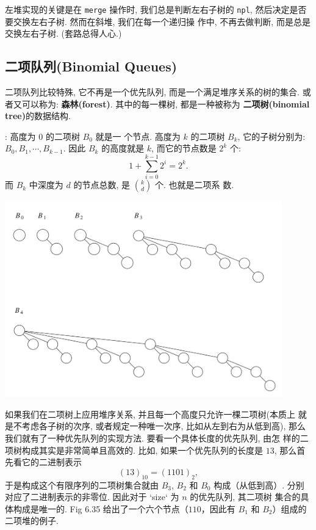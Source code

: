\documentclass[a4paper]{ctexart}
\theoremstyle{definition}
\theoremstyle{definition}
\begin{document}
左堆实现的关键是在 \verb|merge| 操作时, 我们总是判断左右子树的
\verb|npl|, 然后决定是否要交换左右子树. 然而在斜堆, 我们在每一个递归操
作中, 不再去做判断, 而是总是交换左右子树. (套路总得人心.)

\subsection{二项队列(Binomial Queues)}

二项队列比较特殊, 它不再是一个优先队列, 而是一个满足堆序关系的树的集合.
或者又可以称为: {\bf 森林(forest)}. 其中的每一棵树, 都是一种被称为{\bf
  二项树(binomial tree)}的数据结构.

: 高度为 $0$ 的二项树 $B_0$ 就是一
个节点. 高度为 $k$ 的二项树 $B_k$, 它的子树分别为: $B_0, B_1, \cdots,
B_{k - 1}$. 因此 $B_k$ 的高度就是 $k$, 而它的节点数是 $2^k$ 个:
$$ 
1 + \sum_{i = 0}^{k - 1} 2^i = 2^k.  
$$
而 $B_k$ 中深度为 $d$ 的节点总数, 是 $k \choose d$ 个. 也就是二项系
数.

\begin{center}
  \includegraphics[width=0.9\textwidth]{images/B-heap.png}
\end{center}

如果我们在二项树上应用堆序关系, 并且每一个高度只允许一棵二项树(本质上
就是不考虑各子树的次序, 或者规定一种唯一次序, 比如从左到右为从低到高),
那么我们就有了一种优先队列的实现方法. 要看一个具体长度的优先队列, 由怎
样的二项树构成其实是非常简单且高效的. 比如, 如果一个优先队列的长度是
$13$, 那么首先看它的二进制表示
$$
(13)_{10} = (1101)_2,
$$
于是构成这个有限序列的二项树集合就由 $B_3$, $B_2$ 和 $B_0$ 构成（从低到高）. 分别
对应了二进制表示的非零位. 因此对于 `size` 为 $n$ 的优先队列, 其二项树
集合的具体构成是唯一的. Fig 6.35 给出了一个六个节点（$110$，因此有 $B_1$ 和 $B_2$）组成的二项堆的例子. 
\end{document}
